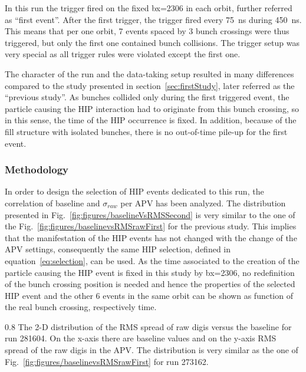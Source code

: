 In this run the trigger fired on the fixed bx=2306 in each orbit, further referred as ``first event''. After the first trigger, the trigger fired every 75~ns during 450~ns. This means that per one orbit, 7 events spaced by 3 bunch crossings were thus triggered, but only the first one contained bunch collisions. The trigger setup was very special as all trigger rules were violated except the first one.


The character of the run and  the data-taking setup resulted in many differences compared to the study presented in section~\ref{sec:firstStudy}, later referred as the ``previous study''. As bunches collided only during the first triggered event, the particle causing the HIP interaction had to originate from this bunch crossing, so in this sense, the time of the HIP occurrence is fixed. In addition, because of the fill structure with isolated bunches, there is no out-of-time pile-up for the first event.

\subsubsection{Methodology}

In order to design the selection of HIP events dedicated to this run, the correlation of baseline and $\sigma_{raw}$ per APV has been analyzed. The distribution presented in Fig.~\ref{fig:figures/baselineVsRMSSecond} is very similar to the one of the Fig.~\ref{fig:figures/baselinevsRMSrawFirst} for the previous study. This implies that the manifestation of the HIP events has not changed with the change of the APV settings, consequently the same HIP selection, defined in equation~\ref{eq:selection}, can be used. As the time associated to the creation of the particle causing the HIP event is fixed in this study by bx=2306, no redefinition of the bunch crossing position is needed and hence the properties of the selected HIP event and the other 6 events in the same orbit can be shown as function of the real bunch crossing, respectively time.

                 {0.8}       %
                 {The 2-D distribution of the RMS spread of raw digis versus the baseline for run 281604. On the x-axis there are baseline values and on the y-axis RMS spread of the raw digis in the APV. The distribution is very similar as the one of Fig.~\ref{fig:figures/baselinevsRMSrawFirst} for run 273162. } %



